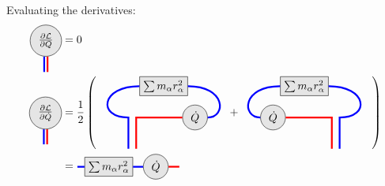 \documentclass{article}
\begin{document}
Evaluating the derivatives:
\begin{align*}
    \begin{tikzpicture}[baseline=-.5ex]
        \node[circle,draw,fill=gray!20] (a) at (0,0) {\(\frac{\partial\mathcal{L}}{\partial Q}\)};
        \draw[blue, ultra thick, transform canvas={xshift=-1.5pt}] (a) -- +(0,-1);
        \draw[red, ultra thick, transform canvas={xshift=1.5pt}] (a) -- +(0,-1);
    \end{tikzpicture} &= 0
    \\ \begin{tikzpicture}[baseline=-.5ex]
        \node[circle,draw,fill=gray!20] (a) at (0,0) {\(\frac{\partial\mathcal{L}}{\partial \dot{Q}}\)};
        \draw[blue, ultra thick, transform canvas={xshift=-1.5pt}] (a) -- +(0,-1);
        \draw[red, ultra thick, transform canvas={xshift=1.5pt}] (a) -- +(0,-1);
    \end{tikzpicture} &= \frac{1}{2}\left(\begin{tikzpicture}[baseline={([yshift=-.5ex]current bounding box.center)}]
        \node (a) at (0,0) {};
        \node[circle,draw,fill=gray!20] (b) at (2,0) {\(\dot{Q}\)};
        \node[draw,fill=gray!20] (c) at (1,1) {\(\sum m_\alpha r_\alpha^2\)};
        \draw[ultra thick, red] (b) -- (a.east) -- +(0,-1);
        \draw[ultra thick, blue] (c) .. controls +(-2,0) and +(-1,0) .. (a.west) -- +(0,-1);
        \draw[ultra thick, blue] (c) .. controls +(2,0) and +(1,0) .. (b);
    \end{tikzpicture} + \begin{tikzpicture}[baseline={([yshift=-.5ex]current bounding box.center)}]
        \node[circle,draw,fill=gray!20] (a) at (0,0) {\(\dot{Q}\)};
        \node (b) at (2,0) {};
        \node[draw,fill=gray!20] (c) at (1,1) {\(\sum m_\alpha r_\alpha^2\)};
        \draw[ultra thick, red] (a) -- (b.west) -- +(0,-1);
        \draw[ultra thick, blue] (c) .. controls +(-2,0) and +(-1,0) .. (a);
        \draw[ultra thick, blue] (c) .. controls +(2,0) and +(1,0) .. (b.east) -- +(0,-1);
    \end{tikzpicture}\right)
    \\ &= \begin{tikzpicture}[baseline={([yshift=-.5ex]current bounding box.center)}]
        \node[draw,fill=gray!20] (l) at (1,0) {\(\sum m_\alpha r_\alpha^2\)};
        \node[circle,draw,fill=gray!20] (q) at (2.5,0) {\(\dot{Q}\)};
        \draw[ultra thick, blue] (0,0) -- (l) -- (q);
        \draw[ultra thick, red] (q) -- (3.25,0);
    \end{tikzpicture}

\end{align*}
\end{document}
